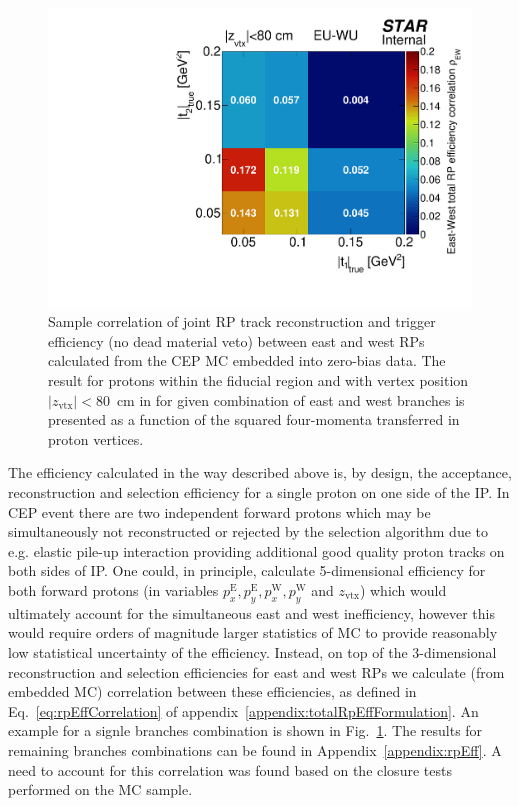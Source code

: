 \begin{figure}[ht!]
\begin{minipage}{.4725\textwidth}
  \includegraphics[width=\linewidth]{graphics/corrections/RpTotalEffEastWestCorrelationVsMandelstamT.pdf}%
  \caption[Sample correlation of joint RP track reconstruction and trigger efficiency between east and west RPs.]{Sample correlation of joint RP track reconstruction and trigger efficiency (no dead material veto) between east and west RPs calculated from the CEP MC embedded into zero-bias data. The result for protons within the fiducial region and with vertex position $|z_{\text{vtx}}|<80$~cm in for given combination of east and west branches is presented as a function of the squared four-momenta transferred in proton vertices.}\label{fig:SimultaneousEastWestRpTrackLoss}
\end{minipage}%
\end{figure}%


The efficiency calculated in the way described above is, by design, the acceptance, reconstruction and selection efficiency for a single proton on one side of the IP. In CEP event there are two independent forward protons which may be simultaneously not reconstructed or rejected by the selection algorithm due to e.g. elastic pile-up interaction providing additional good quality proton tracks on both sides of IP. One could, in principle, calculate 5-dimensional efficiency for both forward protons (in variables $p_{x}^{\text{E}}, p_{y}^{\text{E}}, p_{x}^{\text{W}}, p_{y}^{\text{W}}$ and $z_{\text{vtx}}$) which would ultimately account for the simultaneous east and west inefficiency, however this would require orders of magnitude larger statistics of MC to provide reasonably low statistical uncertainty of the efficiency. Instead, on top of the 3-dimensional reconstruction and selection efficiencies for east and west RPs we calculate (from embedded MC) correlation between these efficiencies, as defined in Eq.~\eqref{eq:rpEffCorrelation} of appendix~\ref{appendix:totalRpEffFormulation}. An example for a signle branches combination is shown in Fig.~\ref{fig:SimultaneousEastWestRpTrackLoss}. The results for remaining branches combinations can be found in Appendix~\ref{appendix:rpEff}. A need to account for this correlation was found based on the closure tests performed on the MC sample.

